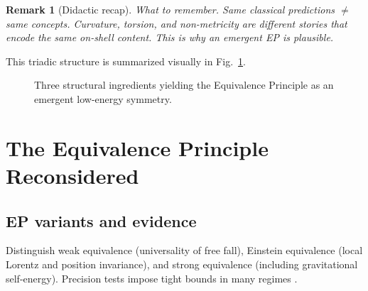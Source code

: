 \documentclass[11pt,a4paper]{article}
\theoremstyle{thmstyleone}
\theoremstyle{thmstyletwo}
\newtheorem{remark}{Remark}
\theoremstyle{thmstylethree}
\begin{document}
        \begin{remark}[Didactic recap]
            \emph{What to remember.} Same classical predictions $\neq$ same concepts. Curvature, torsion, and non-metricity are different stories that encode the same on-shell content. This is why an \emph{emergent} EP is plausible.
        \end{remark}

        This triadic structure is summarized visually in Fig.~\ref{fig:triad}.

        \begin{figure}[ht]
            \centering
            \caption{Three structural ingredients yielding the Equivalence Principle as an emergent low-energy symmetry.}
            \label{fig:triad}
        \end{figure}

    \section{The Equivalence Principle Reconsidered}\label{sec:ep}

    \subsection{EP variants and evidence}\label{subsec:variants}
        Distinguish weak equivalence (universality of free fall), Einstein equivalence (local Lorentz and position invariance), and strong equivalence (including gravitational self-energy). Precision tests impose tight bounds in many regimes \cite{Will2014}.
\end{document}
